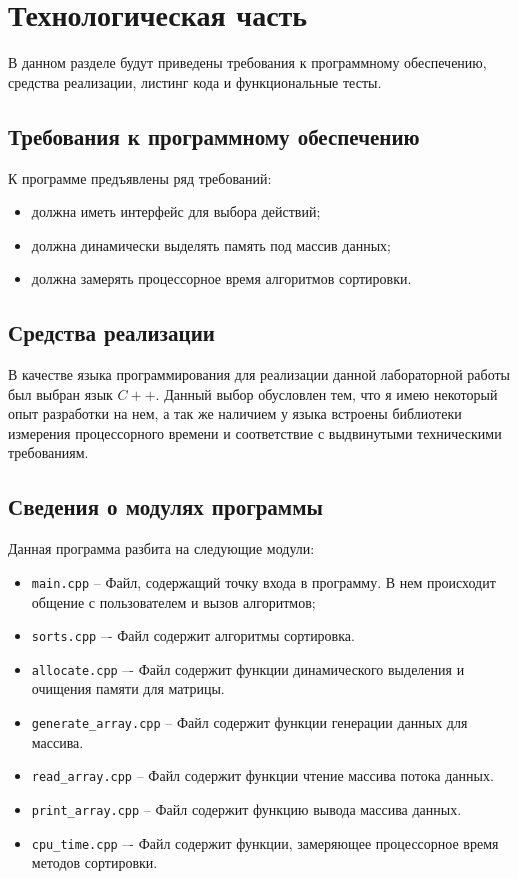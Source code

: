 \chapter{Технологическая часть}

В данном разделе будут приведены требования к программному обеспечению, средства реализации, листинг кода и функциональные тесты.

\section{Требования к программному обеспечению}

К программе предъявлены ряд требований:

\begin{itemize}
	\item должна иметь интерфейс для выбора действий;
	\item должна динамически выделять память под массив данных;
	\item должна замерять процессорное время алгоритмов сортировки.
\end{itemize}

\section{Средства реализации}

В качестве языка программирования для реализации данной лабораторной работы был выбран язык $C++$. Данный выбор обусловлен тем,
что я имею некоторый опыт разработки на нем, а так же наличием у языка
встроены библиотеки измерения процессорного времени и соответствие с выдвинутыми техническими требованиям.

\section{Сведения о модулях программы}

Данная программа разбита на следующие модули:

\begin{itemize}
	\item \texttt{main.cpp} -- Файл, содержащий точку входа в программу. В нем происходит
	общение с пользователем и вызов алгоритмов;
	\item \texttt{sorts.cpp} –- Файл содержит алгоритмы сортировка.
	\item \texttt{allocate.cpp} –- Файл содержит функции динамического выделения и очищения памяти для матрицы.
	\item \texttt{generate\_array.cpp} -- Файл содержит функции генерации данных для массива.
	\item \texttt{read\_array.cpp} -- Файл содержит функции чтение массива потока данных.
	\item \texttt{print\_array.cpp} -- Файл содержит функцию вывода массива данных.
	\item \texttt{cpu\_time.cpp} –- Файл содержит функции, замеряющее процессорное время методов сортировки.
\end{itemize}

